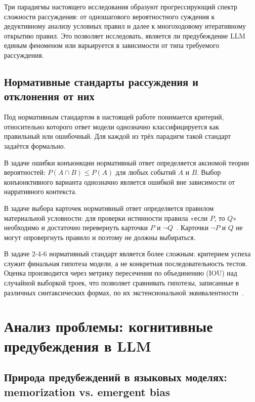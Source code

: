 Три парадигмы настоящего исследования образуют прогрессирующий спектр сложности рассуждения: от одношагового вероятностного суждения к дедуктивному анализу условных правил и далее к многоходовому итеративному открытию правил. Это позволяет исследовать, является ли предубеждение LLM единым феноменом или варьируется в зависимости от типа требуемого рассуждения.

\subsection{Нормативные стандарты рассуждения и отклонения от них}

Под нормативным стандартом в настоящей работе понимается критерий, относительно которого ответ модели однозначно классифицируется как правильный или ошибочный. Для каждой из трёх парадигм такой стандарт задаётся формально.

В задаче ошибки конъюнкции нормативный ответ определяется аксиомой теории вероятностей: $P(A \cap B) \leq P(A)$ для любых событий $A$ и $B$. Выбор конъюнктивного варианта однозначно является ошибкой вне зависимости от нарративного контекста.

В задаче выбора карточек нормативный ответ определяется правилом материальной условности: для проверки истинности правила «если $P$, то $Q$» необходимо и достаточно перевернуть карточки $P$ и $\lnot Q$~\cite{wason1966reasoning}. Карточки $\lnot P$ и $Q$ не могут опровергнуть правило и поэтому не должны выбираться.

В задаче 2-4-6 нормативный стандарт является более сложным: критерием успеха служит финальная гипотеза модели, а не конкретная последовательность тестов. Оценка производится через метрику пересечения по объединению (IOU) над случайной выборкой троек, что позволяет сравнивать гипотезы, записанные в различных синтаксических формах, по их экстенсиональной эквивалентности~\cite{banatt2024wilt}.

\section{Анализ проблемы: когнитивные предубеждения в LLM}

\subsection{Природа предубеждений в языковых моделях: memorization vs. emergent bias}

